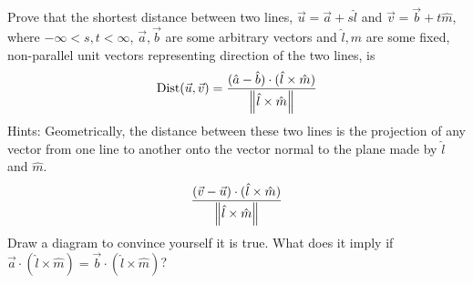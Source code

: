 \begin{Exercise}
Prove that the shortest distance between two lines, $\vec{u} = \vec{a} + s\hat{l}$ and $\vec{v} = \vec{b} + t\hat{m}$, where $-\infty < s,t < \infty$, $\vec{a}, \vec{b}$ are some arbitrary vectors and $\hat{l}, \hat{m}$ are some fixed, non-parallel unit vectors representing direction of the two lines, is
\begin{align*}
\text{Dist}(\vec{u}, \vec{v}) = \frac{(\hat{a}-\hat{b}) \cdot (\hat{l} \times \hat{m})}{\norm{\hat{l} \times \hat{m}}}
\end{align*}
Hints: Geometrically, the distance between these two lines is the projection of any vector from one line to another onto the vector normal to the plane made by $\hat{l}$ and $\hat{m}$.
\begin{align*}
\frac{(\vec{v} - \vec{u}) \cdot (\hat{l} \times \hat{m})}{\norm{\hat{l} \times \hat{m}}}
\end{align*}
Draw a diagram to convince yourself it is true. What does it imply if $\vec{a} \cdot (\hat{l} \times \hat{m}) = \vec{b} \cdot (\hat{l} \times \hat{m})$?
\end{Exercise}

